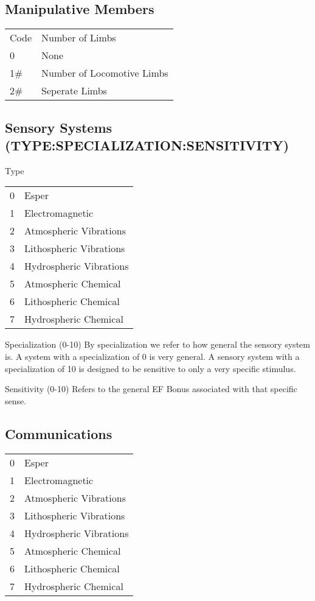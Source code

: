 \subsection{Manipulative Members}

		\begin{tabular}{ll}
		Code 	 &	Number of Limbs \\
		0		 &	None \\
		1\#		 &	Number of Locomotive Limbs \\
		2\#		 &	Seperate Limbs \\
		\end{tabular}

\subsection{Sensory Systems (TYPE:SPECIALIZATION:SENSITIVITY)}

	\begin{relate}
		\item[Type]
			\begin{tabular}{ll}			    
			0	 &	Esper \\
			1	 &	Electromagnetic \\
			2	 &	Atmospheric Vibrations \\
			3	 &	Lithospheric Vibrations \\
			4	 &	Hydrospheric Vibrations \\
			5	 &	Atmospheric Chemical \\
			6	 &	Lithospheric Chemical \\
			7       & Hydrospheric Chemical \\
			\end{tabular}	

		\item[Specialization (0-10)]
		By specialization we refer to how general the sensory system is. A system 
		with a specialization of 0 is very general. A sensory system with a
		specialization of 10 is designed to be sensitive to only a very 
		specific stimulus.

		\item[Sensitivity (0-10)]
		Refers to the general EF Bonus associated with that specific sense.
	\end{relate}

\subsection{Communications}

		\begin{tabular}{ll}			    
		0       & Esper \\
		1       & Electromagnetic  \\
		2       & Atmospheric Vibrations \\
		3       & Lithospheric Vibrations \\
		4       & Hydrospheric Vibrations \\
		5       & Atmospheric Chemical \\
		6       & Lithospheric Chemical \\
		7       & Hydrospheric Chemical \\
		\end{tabular}

